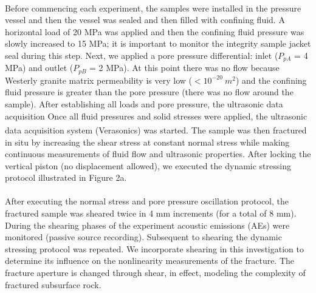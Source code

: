 \documentclass[letterpaper,10pt]{article}
\begin{document}
\paragraph{} Before commencing each experiment, the samples were installed in the pressure vessel and then the vessel was sealed and then filled with confining fluid. A horizontal load of 20 MPa was applied and then the confining fluid pressure was slowly increased to 15 MPa; it is important to monitor the integrity sample jacket seal during this step. Next, we applied a pore pressure differential: inlet ($P_{pA}$ = 4 MPa) and outlet ($P_{pB}$ = 2 MPa). At this point there was no flow because Westerly granite matrix permeability is very low ($< 10^{-20}\ m^2$) and the confining fluid pressure is greater than the pore pressure (there was no flow around the sample). After establishing all loads and pore pressure, the ultrasonic data acquisition Once all fluid pressures and solid stresses were applied, the ultrasonic data acquisition system (Verasonics\textsuperscript{\textregistered}) was started. The sample was then fractured in situ by increasing the shear stress at constant normal stress while making continuous measurements of fluid flow and ultrasonic properties. After locking the vertical piston (no displacement allowed), we executed the dynamic stressing protocol illustrated in Figure 2a.

\paragraph{} After executing the normal stress and pore pressure oscillation protocol, the fractured sample was sheared twice in 4 mm increments (for a total of 8 mm). During the shearing phases of the experiment acoustic emissions (AEs) were monitored (passive source recording). Subsequent to shearing the dynamic stressing protocol was repeated. We incorporate shearing in this investigation to determine its influence on the nonlinearity measurements of the fracture. The fracture aperture is changed through shear, in effect, modeling the complexity of fractured subsurface rock. 

\newpage
\end{document}
